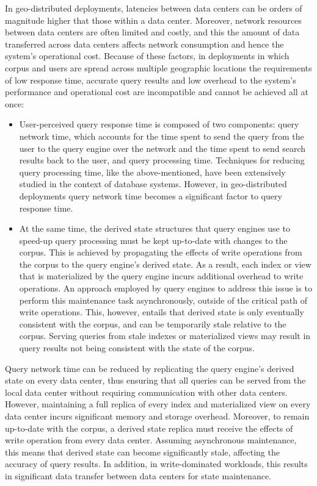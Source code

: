 In geo-distributed deployments,
latencies between data centers can be orders of magnitude higher that those within a data center.
Moreover, network resources between data centers are often limited and costly,
and this the amount of data transferred across data centers affects network consumption and hence the system's operational cost.
Because of these factors,
in deployments in which corpus and users are spread across multiple geographic locations
the requirements of low response time, accurate query results and low overhead to the system's performance and operational
cost are incompatible and cannot be achieved all at once:

\begin{itemize}
  \item User-perceived query response time is composed of two components:
  query network time, which accounts for the time spent to send the query from the user to the query engine over the network
  and the time spent to send search results back to the user, and query processing time.
  Techniques for reducing query processing time, like the above-mentioned, have been extensively studied in the context of database systems.
  However, in geo-distributed deployments query network time becomes a significant factor to query response time.

  \item At the same time, the derived state structures that query engines use to speed-up query processing must be kept up-to-date with changes to the corpus.
  This is achieved by propagating the effects of write operations from the corpus to the query engine's derived state.
  As a result, each index or view that is materialized by the query engine incurs additional overhead to write operations.
  An approach employed by query engines to address this issue is to perform this maintenance task asynchronously,
  outside of the critical path of write operations.
  This, however, entails that derived state is only eventually consistent with the corpus, and can be temporarily stale relative to the corpus.
  Serving queries from stale indexes or materialized views may result in query results not being consistent with the state of the corpus.
\end{itemize}

Query network time can be reduced by replicating the query engine's derived state on every data center,
thus ensuring that all queries can be served from the local data center without requiring communication with other data centers.
However, maintaining a full replica of every index and materialized view on every data center incurs significant memory and storage overhead.
Moreover, to remain up-to-date with the corpus, a derived state replica must receive the effects of write operation from every data center.
Assuming asynchronous maintenance, this means that derived state can become significantly stale, affecting the accuracy of query results.
In addition, in write-dominated workloads, this results in significant data transfer between data centers for state maintenance.


